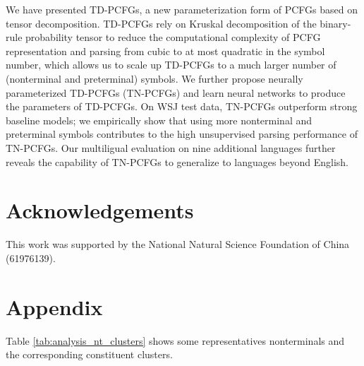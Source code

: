 \documentclass[11pt]{article}
\begin{document}
We have presented TD-PCFGs, a new parameterization form of PCFGs based on tensor decomposition.
TD-PCFGs rely on Kruskal decomposition of the binary-rule probability tensor to reduce the computational complexity of PCFG representation and parsing from cubic to at most quadratic in the symbol number,
which allows us to scale up TD-PCFGs to a much larger number of (nonterminal and preterminal) symbols.
We further propose neurally parameterized TD-PCFGs (TN-PCFGs) and learn neural networks to produce the parameters of TD-PCFGs.
On WSJ test data, 
TN-PCFGs outperform strong baseline models;
we empirically show that using more nonterminal and preterminal symbols contributes to the high unsupervised parsing performance of TN-PCFGs.
Our multiligual evaluation on nine additional languages 
further reveals the capability of TN-PCFGs to generalize to languages beyond English.




\section*{Acknowledgements}
This work was supported by the National Natural Science Foundation of China (61976139).





\appendix
\section{Appendix}

Table \ref{tab:analysis_nt_clusters} shows some representatives nonterminals and the corresponding constituent clusters. 
\end{document}
